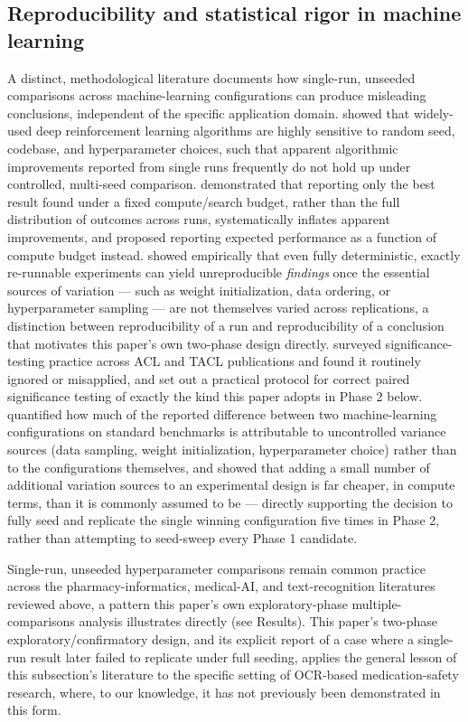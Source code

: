 \documentclass[fleqn,10pt]{wlpeerj}
\begin{document}
\subsection*{Reproducibility and statistical rigor in machine learning}\label{sec:related-repro}

A distinct, methodological literature documents how single-run, unseeded comparisons across machine-learning configurations can produce misleading conclusions, independent of the specific application domain. \citet{henderson2018deep} showed that widely-used deep reinforcement learning algorithms are highly sensitive to random seed, codebase, and hyperparameter choices, such that apparent algorithmic improvements reported from single runs frequently do not hold up under controlled, multi-seed comparison. \citet{dodge2019show} demonstrated that reporting only the best result found under a fixed compute/search budget, rather than the full distribution of outcomes across runs, systematically inflates apparent improvements, and proposed reporting expected performance as a function of compute budget instead. \citet{bouthillier2019unreproducible} showed empirically that even fully deterministic, exactly re-runnable experiments can yield unreproducible \emph{findings} once the essential sources of variation --- such as weight initialization, data ordering, or hyperparameter sampling --- are not themselves varied across replications, a distinction between reproducibility of a run and reproducibility of a conclusion that motivates this paper's own two-phase design directly. \citet{dror2018hitchhikers} surveyed significance-testing practice across ACL and TACL publications and found it routinely ignored or misapplied, and set out a practical protocol for correct paired significance testing of exactly the kind this paper adopts in Phase 2 below. \citet{bouthillier2021accounting} quantified how much of the reported difference between two machine-learning configurations on standard benchmarks is attributable to uncontrolled variance sources (data sampling, weight initialization, hyperparameter choice) rather than to the configurations themselves, and showed that adding a small number of additional variation sources to an experimental design is far cheaper, in compute terms, than it is commonly assumed to be --- directly supporting the decision to fully seed and replicate the single winning configuration five times in Phase 2, rather than attempting to seed-sweep every Phase 1 candidate.

Single-run, unseeded hyperparameter comparisons remain common practice across the pharmacy-informatics, medical-AI, and text-recognition literatures reviewed above, a pattern this paper's own exploratory-phase multiple-comparisons analysis illustrates directly (see Results). This paper's two-phase exploratory/confirmatory design, and its explicit report of a case where a single-run result later failed to replicate under full seeding, applies the general lesson of this subsection's literature to the specific setting of OCR-based medication-safety research, where, to our knowledge, it has not previously been demonstrated in this form.
\end{document}
